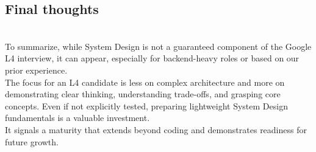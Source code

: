 \subsection{Final thoughts}\label{81mbyQJaNhyxfSmiE5s8O}
\\
To summarize, while System Design is not a guaranteed component of the Google L4 interview, it can appear, especially for backend-heavy roles or based on our prior experience.
\\
The focus for an L4 candidate is less on complex architecture and more on demonstrating clear thinking, understanding trade-offs, and grasping core concepts. Even if not explicitly tested, preparing lightweight System Design fundamentals is a valuable investment.
\\
It signals a maturity that extends beyond coding and demonstrates readiness for future growth.

